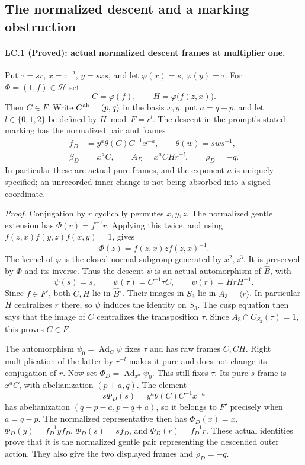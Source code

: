 \subsection{The normalized descent and a marking obstruction}

\paragraph{LC.1 (Proved): actual normalized descent frames at multiplier one.}
Put $\tau=sr$, $x=\tau^{-2}$, $y=sxs$, and let
$\varphi(x)=s$, $\varphi(y)=\tau$. For $\Phi=(1,f)\in\mathcal H$ set
\[
 C=\varphi(f),\qquad H=\varphi\bigl(f(z,x)\bigr).
\]
Then $C\in F$. Write $C^{\rm ab}=(p,q)$ in the basis $x,y$, put
$a=q-p$, and let $l\in\{0,1,2\}$ be defined by
$H\bmod F=r^l$. The descent in the prompt's stated marking has
the normalized pair and frames
\begin{align*}
 f_D&=y^a\theta(C)C^{-1}x^{-a},\qquad \theta(w)=sws^{-1},\\
 \beta_D&=x^aC,\qquad A_D=x^aCHr^{-l},\qquad \rho_D=-q.
\end{align*}
In particular these are actual pure frames, and the exponent $a$ is
uniquely specified; an unrecorded inner change is not being absorbed
into a signed coordinate.

\emph{Proof.}
Conjugation by $r$ cyclically permutes $x,y,z$. The normalized gentle
extension has $\Phi(r)=f^{-1}r$. Applying this twice, and using
$f(z,x)f(y,z)f(x,y)=1$, gives
\[
 \Phi(z)=f(z,x)z f(z,x)^{-1}.
\]
The kernel of $\varphi$ is the closed normal subgroup generated by
$x^2,z^3$. It is preserved by $\Phi$ and its inverse. Thus the descent
$\psi$ is an actual automorphism of $\widehat B$, with
\[
 \psi(s)=s,\qquad \psi(\tau)=C^{-1}\tau C,
 \qquad \psi(r)=HrH^{-1}.
\]
Since $f\in F'$, both $C,H$ lie in $\widehat B'$. Their images in
$S_3$ lie in $A_3=\langle r\rangle$. In particular $H$ centralizes
$r$ there, so $\psi$ induces the identity on $S_3$. The cusp equation
then says that the image of $C$ centralizes the transposition $\tau$.
Since $A_3\cap C_{S_3}(\tau)=1$, this proves $C\in F$.

The automorphism $\psi_0=\operatorname{Ad}_C\psi$ fixes $\tau$ and
has raw frames $C,CH$. Right multiplication of the latter by $r^{-l}$
makes it pure and does not change its conjugation of $r$. Now set
$\Phi_D=\operatorname{Ad}_{x^a}\psi_0$. This still fixes $\tau$.
Its pure $s$ frame is $x^aC$, with abelianization $(p+a,q)$.
The element
\[
 s\Phi_D(s)=y^a\theta(C)C^{-1}x^{-a}
\]
has abelianization $(q-p-a,p-q+a)$, so it belongs to $F'$ precisely
when $a=q-p$. The normalized representative then has
$\Phi_D(x)=x$, $\Phi_D(y)=f_D^{-1}yf_D$,
$\Phi_D(s)=sf_D$, and $\Phi_D(r)=f_D^{-1}r$.
These actual identities prove that it is the normalized gentle pair
representing the descended outer action. They also give the two
displayed frames and $\rho_D=-q$.

